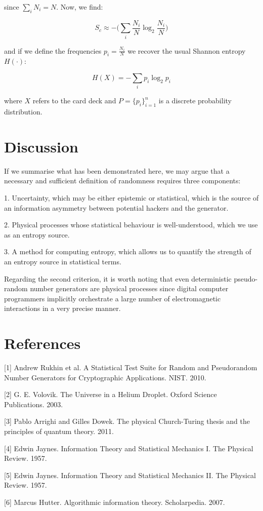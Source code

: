 \documentclass{article}
\begin{document}
since $\sum_i N_i = N$. Now, we find:

\begin{equation}
S_c \approx -\big(\sum_i \frac{N_i}{N} \log_2 \frac{N_i}{N} \big)
\end{equation}

and if we define the frequencies $p_i = \frac{N_i}{N}$ we recover the usual
Shannon entropy $H(\cdot)$:

\begin{equation}
H(X) = - \sum_i p_i \log_2 p_i
\end{equation}

where $X$ refers to the card deck and $P=\{p_i\}_{i=1}^n$ is a discrete probability distribution.

\section{Discussion}

If we summarise what has been demonstrated here, we may argue that a necessary and sufficient definition of randomness requires three components: 

1. Uncertainty, which may be either epistemic or statistical, which is the source of an information asymmetry between potential hackers and the generator. 

2. Physical processes whose statistical behaviour is well-understood, which we use as an entropy source.

3. A method for computing entropy, which allows us to quantify the strength of an entropy source in statistical terms.  

Regarding the second criterion, it is worth noting that even deterministic pseudo-random number generators are physical processes since digital computer programmers implicitly orchestrate a large number of electromagnetic interactions in a very precise manner. 

\section*{References}

\small

[1] Andrew Rukhin et al. A Statistical Test Suite for Random and Pseudorandom Number Generators for Cryptographic Applications. NIST. 2010.

[2] G. E. Volovik. The Universe in a Helium Droplet. Oxford Science Publications. 2003.

[3] Pablo Arrighi and Gilles Dowek. The physical Church-Turing thesis and the principles of quantum theory. 2011.

[4] Edwin Jaynes. Information Theory and Statistical Mechanics I. The Physical Review. 1957.

[5] Edwin Jaynes. Information Theory and Statistical Mechanics II. The Physical Review. 1957.

[6] Marcus Hutter. Algorithmic information theory. Scholarpedia. 2007.
\end{document}
